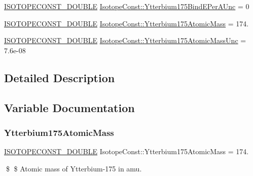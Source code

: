 \begin{DoxyCompactItemize}
\mbox{\hyperlink{group___isotope_const-_macros_ga8f45a7272ce02c0b4c65c44636ed719a}{I\+S\+O\+T\+O\+P\+E\+C\+O\+N\+S\+T\+\_\+\+D\+O\+U\+B\+LE}} \mbox{\hyperlink{group___isotope_const-_ytterbium-_yb175_gae2fe3b941fc7868ab5ef3d3add4f749a}{Isotope\+Const\+::\+Ytterbium175\+Bind\+E\+Per\+A\+Unc}} = 0
\item 
\mbox{\hyperlink{group___isotope_const-_macros_ga8f45a7272ce02c0b4c65c44636ed719a}{I\+S\+O\+T\+O\+P\+E\+C\+O\+N\+S\+T\+\_\+\+D\+O\+U\+B\+LE}} \mbox{\hyperlink{group___isotope_const-_ytterbium-_yb175_ga0c45549a14874670a3f5493ff607814e}{Isotope\+Const\+::\+Ytterbium175\+Atomic\+Mass}} = 174.
\item 
\mbox{\hyperlink{group___isotope_const-_macros_ga8f45a7272ce02c0b4c65c44636ed719a}{I\+S\+O\+T\+O\+P\+E\+C\+O\+N\+S\+T\+\_\+\+D\+O\+U\+B\+LE}} \mbox{\hyperlink{group___isotope_const-_ytterbium-_yb175_ga698e1a59b8cb37f429dd47f18d8cf9b6}{Isotope\+Const\+::\+Ytterbium175\+Atomic\+Mass\+Unc}} = 7.\+6e-\/08
\end{DoxyCompactItemize}


\subsection{Detailed Description}


\subsection{Variable Documentation}
\mbox{\label{group___isotope_const-_ytterbium-_yb175_ga0c45549a14874670a3f5493ff607814e}} 
\subsubsection{\texorpdfstring{Ytterbium175\+Atomic\+Mass}{Ytterbium175AtomicMass}}
{\footnotesize\ttfamily \mbox{\hyperlink{group___isotope_const-_macros_ga8f45a7272ce02c0b4c65c44636ed719a}{I\+S\+O\+T\+O\+P\+E\+C\+O\+N\+S\+T\+\_\+\+D\+O\+U\+B\+LE}} Isotope\+Const\+::\+Ytterbium175\+Atomic\+Mass = 174.}

\$ \$ Atomic mass of Ytterbium-\/175 in amu. \mbox{\label{group___isotope_const-_ytterbium-_yb175_ga698e1a59b8cb37f429dd47f18d8cf9b6}} 
